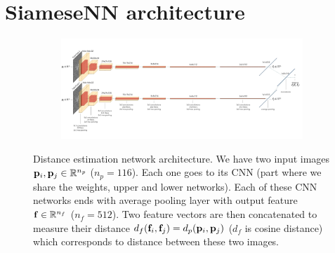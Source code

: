\section{SiameseNN architecture}\label{apx:siamese-architecture}

\begin{figure}[ht!]
    \centering
    \begin{subfigure}[t]{1.0\linewidth}
        \includegraphics[width=\linewidth]{figures/architecture.pdf}
    \end{subfigure}
    \caption{%
        Distance estimation network architecture.
        We have two input images $\mathbf{p}_i,\mathbf{p}_j \in \mathbb{R}^{n_p}$ ($n_p=116$).
        Each one goes to its CNN (part where we share the weights, upper and lower networks).
        Each of these CNN networks ends with average pooling layer with output feature $\mathbf{f} \in \mathbb{R}^{n_f}$ ($n_f=512$).
        Two feature vectors are then concatenated to measure their distance $d_f(\mathbf{f}_i, \mathbf{f}_j)=d_p(\mathbf{p}_i,\mathbf{p}_j)$ ($d_f$ is cosine distance) which corresponds to distance between these two images.
    }\label{fig:de-architecture}
\end{figure}
